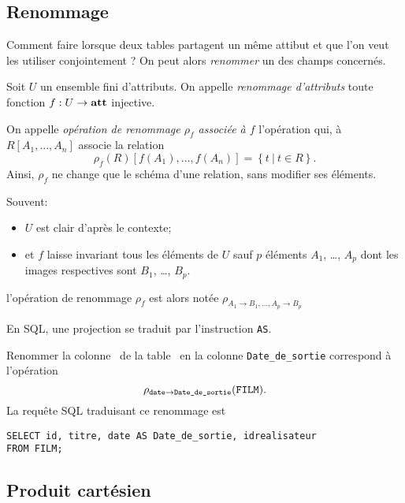 \subsection{Renommage}

Comment faire lorsque deux tables partagent un même attibut et que l'on veut les utiliser conjointement ? 
On peut alors  \emph{renommer} un des champs concernés. 

\begin{defi}[Renommage]
  Soit $U$ un ensemble fini d'attributs.  On appelle \emph{renommage d'attributs} toute fonction $f : U\to \mathbf{att}$
  injective.

  On appelle \emph{opération de renommage $\rho_{f}$ associée à $f$}
  l'opération qui, à $R[A_1,\dots,A_n]$ associe la relation 
  \begin{equation*}
    \rho_{f}(R)[f(A_1),\dots,f(A_n)]=\left\{ t ~|~ t \in R\right\}.
  \end{equation*}
  Ainsi, $\rho_f$ ne change que le schéma d'une relation, sans modifier ses éléments. 

  Souvent:
  \begin{itemize}
  \item  $U$ est clair d'après le contexte;
  \item et $f$ laisse invariant tous les éléments de $U$ sauf $p$
    éléments $A_{1}$, \ldots{}, $A_{p}$ dont les images respectives
    sont $B_{1}$, \ldots{}, $B_{p}$.
  \end{itemize}
  l'opération de renommage $\rho_{f}$ est alors notée
  $\rho_{A_{1}\rightarrow B_{1},\ldots,A_{p}\rightarrow B_{p}}$
\end{defi}

En SQL, une projection se traduit par l'instruction \texttt{AS}.
\begin{exemple}
  Renommer la colonne \ttdate\ de la table \FILM\ en la colonne \texttt{Date\_de\_sortie} correspond à l'opération 
  \begin{equation*}
    \rho_{\mathtt{date} \rightarrow \texttt{Date\_de\_sortie}} (\mathtt{FILM}).
  \end{equation*}
La requête SQL traduisant ce renommage est 
\begin{verbatim}
SELECT id, titre, date AS Date_de_sortie, idrealisateur
FROM FILM;
\end{verbatim}

\end{exemple}


\subsection{Produit cartésien}

